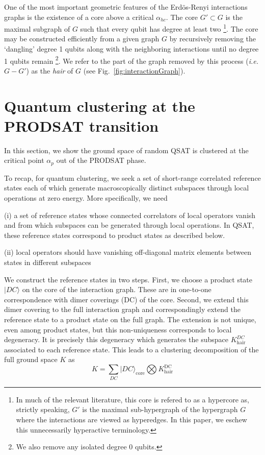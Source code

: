 \documentclass[aps,pra,twocolumn,superscriptaddress,amsmath]{revtex4-1}
\newcommand{\ket}[1]{|#1\rangle}
\begin{document}
One of the most important geometric features of the Erd\"os-Renyi interactions graphs is the existence of a core above a critical $\alpha_{hc}$.  
The core $G' \subset G$ is the maximal subgraph of $G$ such that every qubit has degree at least two %
\footnote{In much of the relevant literature, this core is refered to as a hypercore as, strictly speaking, $G'$ is the maximal sub-hypergraph of the hypergraph $G$ where the interactions are viewed as hyperedges. In this paper, we eschew this unnecessarily hyperactive terminology.}.
%
The core may be constructed efficiently from a given graph $G$ by recursively removing the `dangling' degree 1 qubits along with the neighboring interactions until no degree 1 qubits remain \footnote{We also remove any isolated degree 0 qubits.}. 
We refer to the part of the graph removed by this process (\emph{i.e.} $G-G'$) as the \emph{hair} of $G$ (see Fig.~\ref{fig:interactionGraph}). 



\section{Quantum clustering at the PRODSAT transition}
In this section, we show the ground space of random QSAT is clustered at the critical point $\alpha_{p}$ out of the PRODSAT phase. 

To recap, for quantum clustering, we seek a set of short-range correlated reference states each of which generate macroscopically distinct subspaces through local operations at zero energy. More specifically, we need 

(i) a set of reference states whose connected correlators of local operators vanish and from which subspaces can be generated through local operations. In QSAT, these reference states correspond to product states as described below.

(ii) local operators should have vanishing off-diagonal matrix elements between states in different subspaces 

We construct the reference states in two steps. 
First, we choose a product state $\ket{DC}$ on the core of the interaction graph. 
These are in one-to-one correspondence with dimer coverings (DC) of the core.
Second, we extend this dimer covering to the full interaction graph and correspondingly extend the reference state to a product state on the full graph.
The extension is not unique, even among product states, but this non-uniqueness corresponds to local degeneracy.
It is precisely this degeneracy which generates the subspace $K^{DC}_{\mathrm{hair}}$ associated to each reference state.
This leads to a clustering decomposition of the full ground space $K$ as
\begin{equation}
K=\sum_{DC}|DC\rangle_{\mathrm{core}} \bigotimes K^{\mathrm{DC}}_{\mathrm{hair}}
\label{eq:DCHair}
\end{equation}
\end{document}

